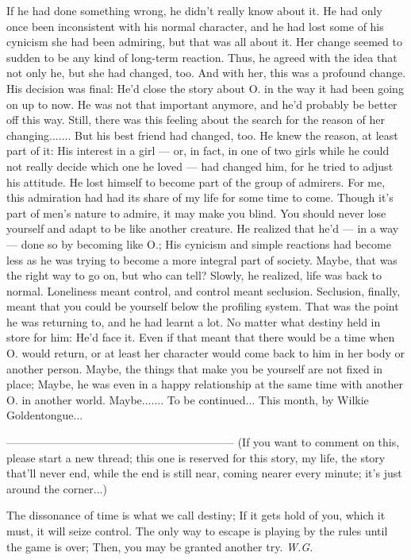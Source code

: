 If he had done something wrong, he didn't really know about it. He had only once been inconsistent with his normal character, and he had lost some of his cynicism she had been admiring, but that was all about it. Her change seemed to sudden to be any kind of long-term reaction. 
Thus, he agreed with the idea that not only he, but she had changed, too. And with her, this was a profound change. 
His decision was final: He'd close the story about O. in the way it had been going on up to now. He was not that important anymore, and he'd probably be better off this way. Still, there was this feeling about the search for the reason of her changing....... 
But his best friend had changed, too. He knew the reason, at least part of it: His interest in a girl --- or, in fact, in one of two girls while he could not really decide which one he loved --- had changed him, for he tried to adjust his attitude. He lost himself to become part of the group of admirers. 
For me, this admiration had had its share of my life for some time to come. Though it's part of men's nature to admire, it may make you blind. You should never lose yourself and adapt to be like another creature. 
He realized that he'd --- in a way --- done so by becoming like O.; His cynicism and simple reactions had become less as he was trying to become a more integral part of society. Maybe, that was the right way to go on, but who can tell? 
Slowly, he realized, life was back to normal. Loneliness meant control, and control meant seclusion. Seclusion, finally, meant that you could be yourself below the profiling system. That was the point he was returning to, and he had learnt a lot. 
No matter what destiny held in store for him: He'd face it. Even if that meant that there would be a time when O. would return, or at least her character would come back to him in her body or another person. Maybe, the things that make you be yourself are not fixed in place; Maybe, he was even in a happy relationship at the same time with another O. in another world. 
Maybe.......
To be continued...
This month, by Wilkie Goldentongue...

--------------------------------------------------------------
(If you want to comment on this, please start a new thread; this one is reserved for this story, my life, the story that'll never end, while the end is still near, coming nearer every minute; it's just around the corner...)

The dissonance of time 
is what we call destiny; 
If it gets hold of you, 
which it must, 
it will seize control. 
The only way to escape 
is playing by the rules 
until the game is over; 
Then, you may be granted another try. 
\emph{W.G.}

